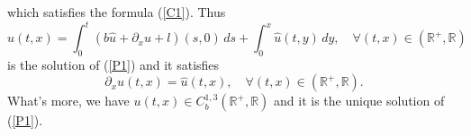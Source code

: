 \documentclass[12pt,a4paper]{ctexart}
\begin{document}
which satisfies the formula (\ref{C1}). Thus
\begin{equation*}
    u(t, x) = \int_{0}^{t} (b \hat u + \partial_{x} \hat u + l)(s, 0) \, d s + \int_{0}^{x} \hat u (t, y) \, d y, \quad \forall (t, x) \in (\mathbb{R}^{+}, \mathbb{R})
\end{equation*}
is the solution of (\ref{P1}) and it satisfies
\begin{equation*}
    \partial_{x} u (t, x) = \hat u (t, x), \quad \forall (t, x) \in (\mathbb{R}^{+}, \mathbb{R}).
\end{equation*}
What's more, we have $u(t, x) \in C_{b}^{1,3} (\mathbb{R}^{+}, \mathbb{R})$ and it is the unique solution of (\ref{P1}).
\end{document}
